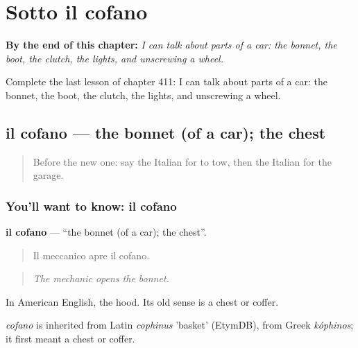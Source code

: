 
\chapter{Sotto il cofano}
\label{ch:it-sotto-il-cofano}

\begin{chapteropening}
\textbf{By the end of this chapter:} \emph{I can talk about parts of a car: the bonnet, the boot, the clutch, the lights, and unscrewing a wheel.}

Complete the last lesson of chapter 411: I can talk about parts of a car: the bonnet, the boot, the clutch, the lights, and unscrewing a wheel.
\end{chapteropening}

\section[il cofano]{il cofano — the bonnet (of a car); the chest}

\label{lesson:IT-C411-cofano}



\begin{quote}
Before the new one: say the Italian for to tow, then the Italian for the garage.
\end{quote}

\subsection*{You'll want to know: il cofano}
\textbf{il cofano} — \textquotedblleft{}the bonnet (of a car); the chest\textquotedblright{}.

\begin{quote}
Il meccanico apre il cofano.
\end{quote}

\begin{quote}
\emph{The mechanic opens the bonnet.}
\end{quote}

In American English, the hood. Its old sense is a chest or coffer.

\begin{cousinweb}
\emph{cofano} is inherited from Latin \emph{cophinus} 'basket' (EtymDB), from Greek \emph{kóphinos}; it first meant a chest or coffer.
\end{cousinweb}

